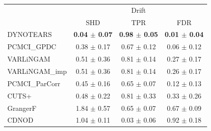 \begin{tabular}{lccc}
\toprule
 & \multicolumn{3}{c}{Drift} \\
 & SHD & TPR & FDR \\
\midrule
DYNOTEARS & \textbf{0.04 $\pm$ 0.07} & \textbf{0.98 $\pm$ 0.05} & \textbf{0.01 $\pm$ 0.04} \\
PCMCI\_GPDC & 0.38 $\pm$ 0.17 & 0.67 $\pm$ 0.12 & 0.06 $\pm$ 0.12 \\
VARLiNGAM & 0.51 $\pm$ 0.36 & 0.81 $\pm$ 0.14 & 0.27 $\pm$ 0.17 \\
VARLiNGAM\_imp & 0.51 $\pm$ 0.36 & 0.81 $\pm$ 0.14 & 0.26 $\pm$ 0.17 \\
PCMCI\_ParCorr & 0.45 $\pm$ 0.16 & 0.65 $\pm$ 0.07 & 0.12 $\pm$ 0.13 \\
CUTS+ & 0.48 $\pm$ 0.22 & 0.81 $\pm$ 0.33 & 0.33 $\pm$ 0.26 \\
GrangerF & 1.84 $\pm$ 0.57 & 0.65 $\pm$ 0.07 & 0.67 $\pm$ 0.09 \\
CDNOD & 1.04 $\pm$ 0.11 & 0.03 $\pm$ 0.06 & 0.92 $\pm$ 0.18 \\
\bottomrule
\end{tabular}
